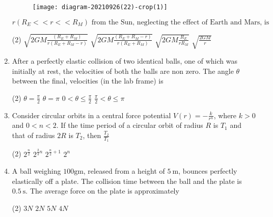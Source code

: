 \begin{enumerate}
	\begin{figure}[H]
		\centering
		\texttt{[image: diagram-20210926(22)-crop(1)]}
	\end{figure}
	$r\left(R_{E}<<r<<R_{M}\right) \text { from the Sun, neglecting the effect of Earth and Mars, is }$
	{}
\begin{tasks}(2)
	\task[\textbf{A.}] $\sqrt{2 G M \frac{\left(R_{E}+R_{M}\right)}{r\left(R_{E}+R_{M}-r\right)}}$
	\task[\textbf{B.}]$\sqrt{2 G M \frac{\left(R_{E}+R_{M}-r\right)}{r\left(R_{E}+R_{M}\right)}}$
	\task[\textbf{C.}]$\sqrt{2 G M \frac{R_{E}}{r R_{M}}}$
	\task[\textbf{D.}]$\sqrt{\frac{2 G M}{r}}$
\end{tasks}
	\item After a perfectly elastic collision of two identical balls, one of which was initially at rest, the velocities of both the balls are non zero. The angle $\theta$ between the final, velocities (in the lab frame) is
	{}
\begin{tasks}(2)
	\task[\textbf{A.}] $\theta=\frac{\pi}{2}$
	\task[\textbf{B.}]$\theta=\pi$
	\task[\textbf{C.}]$0<\theta \leq \frac{\pi}{2}$
	\task[\textbf{D.}] $\frac{\pi}{2}<\theta \leq \pi$
\end{tasks}
	\item Consider circular orbits in a central force potential $V(r)=-\frac{k}{r^{n}}$, where $k>0$ and $0<n<2$. If the time period of a circular orbit of radius $R$ is $T_{1}$ and that of radius $2 R$ is $T_{2}$, then $\frac{T_{2}}{T_{1}}$
	{}
\begin{tasks}(2)
	\task[\textbf{A.}] $2^{\frac{n}{2}}$
	\task[\textbf{B.}]$2^{\frac{2}{3} n}$
	\task[\textbf{C.}]$2^{\frac{n}{2}+1}$
	\task[\textbf{D.}]$2^{n}$
\end{tasks}
	\item A ball weighing $100 \mathrm{gm}$, released from a height of $5 \mathrm{~m}$, bounces perfectly elastically off a plate. The collision time between the ball and the plate is $0.5 \mathrm{~s}$. The average force on the plate is approximately
	{}
\begin{tasks}(2)
	\task[\textbf{A.}] $3 N$
	\task[\textbf{B.}]$2 N$
	\task[\textbf{C.}]$5 N$
	\task[\textbf{D.}]$4 N$
\end{tasks}


\end{enumerate}
